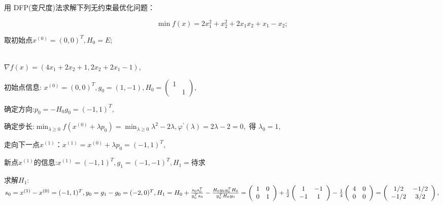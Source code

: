 \documentclass[cn]{elegantbook}
\begin{document}
\begin{exercisez}
 用 DFP(变尺度)法求解下列无约束最优化问题：

$$\min f(x)=2 x_{1}^{2}+x_{2}^{2}+2 x_{1} x_{2}+x_{1}-x_{2} ;$$

取初始点$  x^{(0)}=(0,0)^{T}, H_{0}=E ;$
\end{exercisez}
\begin{solution}\\
$\nabla f(x)=\left(4 x_{1}+2 x_{2}+1,2 x_{2}+2 x_{1}-1\right),$
\vspace{5pt}

 \textcolor[rgb]{1.00,0.00,0.00}{\large 初始点信息:}
 $ x^{(0)}=(0,0)^{T}, g_{0}=(1,-1),
H_{0}=\left(\begin{array}{ll}
1 & \\
& 1
\end{array}\right),$
\vspace{5pt}

 \textcolor[rgb]{1.00,0.00,0.00}{\large 确定方向:}$ p_{0}=-H_{0} g_{0}=(-1,1)^{T},$
 \vspace{5pt}

 \textcolor[rgb]{1.00,0.00,0.00}{\large 确定步长:}$\displaystyle\min_{\lambda\geq 0} f(x^{(0)}+\lambda p_{0})=\min_{\lambda\geq 0}\lambda^{2}-2 \lambda, \varphi^{\prime}(\lambda)=2 \lambda-2=0, \text { 得 } \lambda_{0}=1, $
 \vspace{5pt}

 \textcolor[rgb]{1.00,0.00,0.00}{\large 走向下一点$x^{(1)}$}：$x^{(1)}=x^{(0)}+\lambda p_{0}=(-1,1)^{T},$
 \vspace{30pt}


 \textcolor[rgb]{0.00,0.50,1.00}{\large 新点$x^{(1)}$的信息:}$x^{(1)}=(-1,1)^{T},g_{1}=(-1,-1)^{T},H_1=$待求
 \vspace{5pt}

求解$H_1:$\\
$s_{0}=x^{(1)}-x^{(0)}=(-1,1)^{T}, y_{0}=g_{1}-g_{0}=(-2,0)^{T}, H_{1}=H_{0}+\frac{s_{0} s_{0}^{T}}{y_{0}^{T} s_{0}}-\frac{H_{0} y_{0} y_{0}^{T} H_{0}}{y_{0}^{T} H_{0} y_{0}} \\
=\left(\begin{array}{cc}
1 & 0 \\
0 & 1
\end{array}\right)+\frac{1}{2}\left(\begin{array}{cc}
1 & -1 \\
-1 & 1
\end{array}\right)-\frac{1}{4}\left(\begin{array}{cc}
4 & 0 \\
0 & 0
\end{array}\right)=\left(\begin{array}{cc}
1 / 2 & -1 / 2 \\
-1 / 2 & 3 / 2
\end{array}\right),$
\vspace{5pt}


\end{solution}
\end{document}
